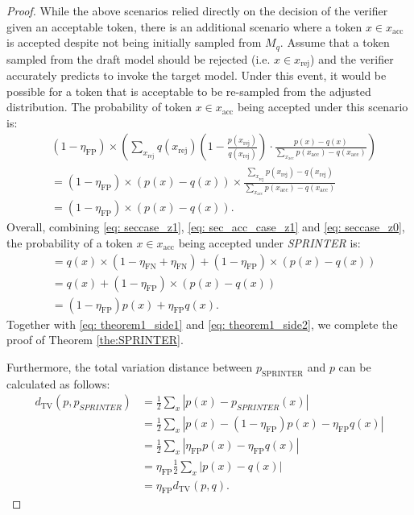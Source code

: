 \documentclass{article}
\theoremstyle{plain}
\theoremstyle{definition}
\theoremstyle{remark}
\begin{document}
\begin{proof}
    
    While the above scenarios relied directly on the decision of the verifier given an acceptable token, there is an additional scenario where a token $x \in x_\text{acc}$ is accepted despite not being initially sampled from $M_q$. Assume that a token sampled from the draft model should be rejected (i.e. $x \in x_\text{rej}$) and the verifier accurately predicts to invoke the target model. Under this event, it would be possible for a token that is acceptable to be re-sampled from the adjusted distribution.    
    The probability of token $x \in x_\text{acc}$ being accepted under this scenario is:
    \begin{align}
         &(1-\eta_\text{FP}) \times \left( \sum_{x_{\text{rej}}} q(x_\text{rej}) (1-\frac{p(x_\text{rej})}{q(x_\text{rej})}) \cdot \frac{p(x)-q(x)}{\sum_{x_\text{acc}} p(x_\text{acc}) - q(x_\text{acc})} \right)  \nonumber\\
         & = (1-\eta_\text{FP}) \times (p(x)-q(x))\times  \frac{\sum_{x_\text{rej}} p(x_\text{rej}) -q(x_\text{rej})}{\sum_{x_\text{acc}} p(x_\text{acc}) - q(x_\text{acc})}\nonumber\\
         & = (1-\eta_\text{FP}) \times (p(x)-q(x)). \label{eq: seccase_z0}
    \end{align}
    Overall, combining \eqref{eq: seccase_z1}, \eqref{eq: sec_acc_case_z1} and \eqref{eq: seccase_z0}, the probability of a token $x \in x_\text{acc}$ being accepted under \textit{SPRINTER} is:
    \begin{align}
         &=q(x) \times (1-\eta_\text{FN}+ \eta_\text{FN}) + (1-\eta_\text{FP}) \times (p(x)-q(x)) \nonumber\\
         & = q(x) +(1-\eta_\text{FP}) \times (p(x)-q(x))  \nonumber\\
         & = (1-\eta_\text{FP}) p(x) + \eta_\text{FP} q(x). \label{eq: theorem1_side2}
    \end{align}
    Together with \eqref{eq: theorem1_side1} and \eqref{eq: theorem1_side2}, we complete the proof of Theorem \ref{the:SPRINTER}.
    
 Furthermore, the total variation distance between $p_\text{SPRINTER}$ and $p$ can be calculated as follows:
 \begin{align}
 d_\text{TV}(p,p_\textit{SPRINTER}) &= \frac{1}{2}\sum_{x} |p(x) - p_\textit{SPRINTER}(x)| \nonumber\\
 &= \frac{1}{2}\sum_{x} |p(x) - (1-\eta_\text{FP}) p(x) - \eta_\text{FP}q(x)| \nonumber\\
  &= \frac{1}{2}\sum_{x} |\eta_\text{FP}p(x) -\eta_\text{FP}q(x)|\nonumber\\
    &= \eta_\text{FP} \frac{1}{2}\sum_{x} |p(x) -q(x)|\nonumber\\
    &= \eta_\text{FP} d_\text{TV}(p,q).
 \end{align}
\end{proof}
\end{document}
